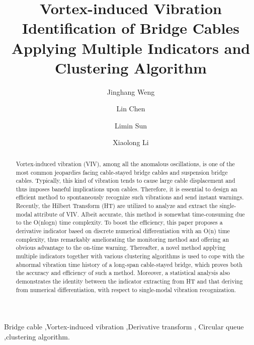 \documentclass[preprint, 3p, times, compress, 11pt]{elsarticle}
\begin{document}
\begin{frontmatter}
\title{Vortex-induced Vibration Identification of Bridge Cables 
        Applying Multiple Indicators and Clustering Algorithm}
\author[tongji]{Jinghang Weng}
\author[tongji]{Lin Chen}
\author[tongji,lab,qizhi]{Limin Sun}
\author[ccc]{Xiaolong Li}
\address[tongji]{Department of Bridge Engineering, Tongji University, 
    Shanghai 200092, China}
\address[lab]{State Key Laboratory of Disaster Reduction of Civil 
    Engineering, Tongji University, Shanghai 200092, China}
\address[qizhi]{Shanghai Qi Zhi Institute, Shanghai 200092, China}
\address[ccc]{China Communications Construction Ltd., Beijing 100101, China}

\begin{abstract}
Vortex-induced vibration (VIV), among all the anomalous oscillations, 
is one of the most common jeopardies facing cable-stayed bridge cables 
and suspension bridge cables. Typically, this kind of vibration tends 
to cause large cable displacement and thus imposes baneful implications 
upon cables. Therefore, it is essential to design an efficient method 
to spontaneously recognize such vibrations and send instant warnings. 
Recently, the Hilbert Transform (HT) are utilized to analyze and extract 
the single-modal attribute of VIV. Albeit accurate, this method is 
somewhat time-consuming due to the O(nlogn) time complexity. To boost 
the efficiency, this paper proposes a derivative indicator based on 
discrete numerical differentiation with an O(n) time complexity, thus 
remarkably ameliorating the monitoring method and offering an obvious 
advantage to the on-time warning. Thereafter, a novel method applying 
multiple indicators together with various clustering algorithms is used 
to cope with the abnormal vibration time history of a long-span 
cable-stayed bridge, which proves both the accuracy and efficiency of 
such a method. Moreover, a statistical analysis also demonstrates the 
identity between the indicator extracting from HT and that deriving from 
numerical differentiation, with respect to single-modal vibration 
recognization. 
\end{abstract}

\begin{keyword}
Bridge cable \sep Vortex-induced vibration \sep Derivative transform \sep 
Circular queue \sep clustering algorithm. 
\end{keyword}
\end{frontmatter}
\end{document}
